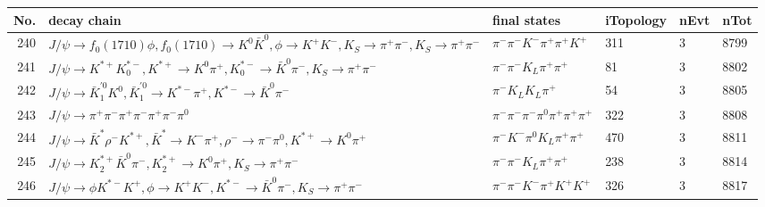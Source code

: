 \begin{table}[htbp] 
\begin{center}
\begin{small}
\begin{tabular}{rlllll}\hline\hline
 No. & decay chain & final states &  iTopology & nEvt & nTot \\\hline
240&$J/\psi       \rightarrow f_{0}(1710)    \phi           , f_{0}(1710)     \rightarrow K^{0}          \bar{K}^{0}   , \phi            \rightarrow K^{+}          K^{-}          , K_{S}           \rightarrow \pi^{+}        \pi^{-}        , K_{S}           \rightarrow \pi^{+}        \pi^{-}        $&$\pi^{-}        \pi^{-}        K^{-}          \pi^{+}        \pi^{+}        K^{+}          $&  311&    3& 8799\\
241&$J/\psi       \rightarrow K^{*+}         K_{0}^{*-}     , K^{*+}          \rightarrow K^{0}          \pi^{+}        , K_{0}^{*-}      \rightarrow \bar{K}^{0}   \pi^{-}        , K_{S}           \rightarrow \pi^{+}        \pi^{-}        $&$\pi^{-}        \pi^{-}        K_{L}          \pi^{+}        \pi^{+}        $&   81&    3& 8802\\
242&$J/\psi       \rightarrow \bar{K}_1^{'0}K^{0}          , \bar{K}_1^{'0} \rightarrow K^{*-}         \pi^{+}        , K^{*-}          \rightarrow \bar{K}^{0}   \pi^{-}        $&$\pi^{-}        K_{L}          K_{L}          \pi^{+}        $&   54&    3& 8805\\
243&$J/\psi       \rightarrow \pi^{+}        \pi^{-}        \pi^{+}        \pi^{-}        \pi^{+}        \pi^{-}        \pi^{0}        $&$\pi^{-}        \pi^{-}        \pi^{-}        \pi^{0}        \pi^{+}        \pi^{+}        \pi^{+}        $&  322&    3& 8808\\
244&$J/\psi       \rightarrow \bar{K}^{*}   \rho^{-}      K^{*+}         , \bar{K}^{*}    \rightarrow K^{-}          \pi^{+}        , \rho^{-}       \rightarrow \pi^{-}        \pi^{0}        , K^{*+}          \rightarrow K^{0}          \pi^{+}        $&$\pi^{-}        K^{-}          \pi^{0}        K_{L}          \pi^{+}        \pi^{+}        $&  470&    3& 8811\\
245&$J/\psi       \rightarrow K_2^{*+}       \bar{K}^{0}   \pi^{-}        , K_2^{*+}        \rightarrow K^{0}          \pi^{+}        , K_{S}           \rightarrow \pi^{+}        \pi^{-}        $&$\pi^{-}        \pi^{-}        K_{L}          \pi^{+}        \pi^{+}        $&  238&    3& 8814\\
246&$J/\psi       \rightarrow \phi           K^{*-}         K^{+}          , \phi            \rightarrow K^{+}          K^{-}          , K^{*-}          \rightarrow \bar{K}^{0}   \pi^{-}        , K_{S}           \rightarrow \pi^{+}        \pi^{-}        $&$\pi^{-}        \pi^{-}        K^{-}          \pi^{+}        K^{+}          K^{+}          $&  326&    3& 8817\\

\end{tabular}
\end{small}
\end{center}
\end{table}
